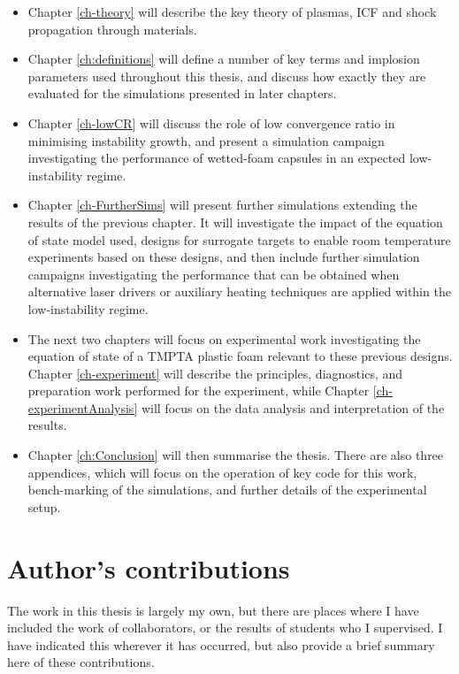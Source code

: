 \begin{itemize}
	\item Chapter \ref{ch-theory} will describe the key theory of plasmas, ICF and shock propagation through materials.
	\item Chapter \ref{ch:definitions} will define a number of key terms and implosion parameters used throughout this thesis, and discuss how exactly they are evaluated for the simulations presented in later chapters.
	\item Chapter \ref{ch-lowCR} will discuss the role of low convergence ratio in minimising instability growth, and present a simulation campaign investigating the performance of wetted-foam capsules in an expected low-instability regime.
	\item Chapter \ref{ch-FurtherSims} will present further simulations extending the results of the previous chapter. It will investigate the impact of the equation of state model used, designs for surrogate targets to enable room temperature experiments based on these designs, and then include further simulation campaigns investigating the performance that can be obtained when alternative laser drivers or auxiliary heating techniques are applied within the low-instability regime.
	\item The next two chapters will focus on experimental work investigating the equation of state of a TMPTA plastic foam relevant to these previous designs. Chapter \ref{ch-experiment} will describe the principles, diagnostics, and preparation work performed for the experiment, while Chapter \ref{ch-experimentAnalysis} will focus on the data analysis and interpretation of the results.
	\item Chapter \ref{ch:Conclusion} will then summarise the thesis. There are also three appendices, which will focus on the operation of key code for this work, bench-marking of the simulations, and further details of the experimental setup.
\end{itemize}

\section{Author's contributions}

The work in this thesis is largely my own, but there are places where I have included the work of collaborators, or the results of students who I supervised. I have indicated this wherever it has occurred, but also provide a brief summary here of these contributions.

